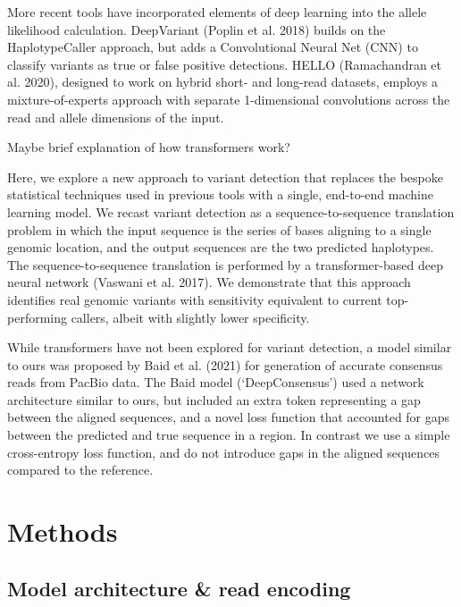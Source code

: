 \documentclass[]{article}
\begin{document}
More recent tools have incorporated elements of deep learning into the allele likelihood calculation. DeepVariant (Poplin et al. 2018) builds on the HaplotypeCaller approach, but adds a Convolutional Neural Net (CNN) to classify variants as true or false positive detections. HELLO (Ramachandran et al. 2020), designed to work on hybrid short- and long-read datasets, employs a mixture-of-experts approach with separate 1-dimensional convolutions across the read and allele dimensions of the input. 

Maybe brief explanation of how transformers work?

Here, we explore a new approach to variant detection that replaces the bespoke statistical techniques used in previous tools with a single, end-to-end machine learning model. We recast variant detection as a sequence-to-sequence translation problem in which the input sequence is the series of bases aligning to a single genomic location, and the output sequences are the two predicted haplotypes. The sequence-to-sequence translation is performed by a transformer-based deep neural network (Vaswani et al. 2017). We demonstrate that this approach identifies real genomic variants with sensitivity equivalent to current top-performing callers, albeit with slightly lower specificity. 

While transformers have not been explored for variant detection, a model similar to ours was proposed by Baid et al. (2021) for generation of accurate consensus reads from PacBio data. The Baid model (`DeepConsensus') used a network architecture similar to ours, but included an extra token representing a gap between the aligned sequences, and a novel loss function that accounted for gaps between the predicted and true sequence in a region. In contrast we use a simple cross-entropy loss function, and do not introduce gaps in the aligned sequences compared to the reference. 

\section{Methods}

\subsection{Model architecture \& read encoding}
\end{document}
